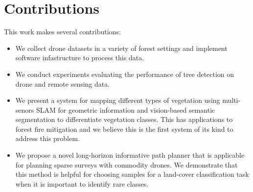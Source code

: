 \section{Contributions}
This work makes several contributions:
\begin{itemize}
    \item We collect drone datasets in a variety of forest settings and implement software infastructure to process this data.
    \item We conduct experiments evaluating the performance of tree detection on drone and remote sensing data. 
    \item We present a system for mapping different types of vegetation using multi-senors  SLAM for geometric information and vision-based semantic segmentation to differentiate vegetation classes. This has applications to forest fire mitigation and we believe this is the first system of its kind to address this problem. 
    \item We propose a novel long-horizon informative path planner that is applicable for planning sparse surveys with commodity drones. We demonstrate that this method is helpful for choosing samples for a land-cover classification task when it is important to identify rare classes.
\end{itemize}

        

